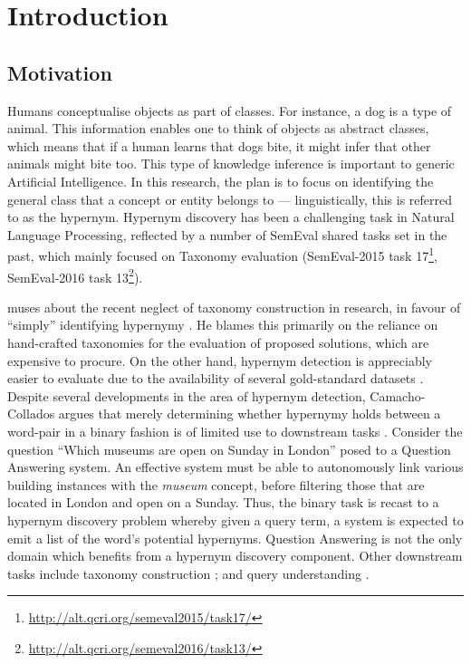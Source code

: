 \chapter{Introduction}

\section{Motivation}
Humans conceptualise objects as part of classes.  For instance, a dog is a type of animal. This information
enables one to think of objects as abstract classes, which means that if a human learns that dogs bite, it might infer that other animals might bite too.  This type of knowledge inference is important to generic Artificial Intelligence. In this research, the plan is to focus on identifying the general class that a concept or entity belongs to — linguistically, this is referred
to as the hypernym.  Hypernym discovery has been a challenging task in Natural Language Processing, reflected by a number of SemEval shared tasks set in the past, which mainly focused on Taxonomy evaluation (SemEval-2015 task 17\footnote{\url{http://alt.qcri.org/semeval2015/task17/}}, SemEval-2016 task 13\footnote{\url{http://alt.qcri.org/semeval2016/task13/}}).  

\citeauthor{camacho2017we} muses about the recent neglect of taxonomy construction in research, in favour of ``simply'' identifying hypernymy \citep{camacho2017we}.  He blames this primarily on the reliance on hand-crafted taxonomies for the evaluation of proposed solutions, which are expensive to procure.  On the other hand, hypernym detection is appreciably easier to evaluate due to the availability of several gold-standard datasets \citep{Baroni2011, santus2015evalution, weeds2014learning}.  Despite several developments in the area of hypernym detection, Camacho-Collados argues that merely determining whether hypernymy holds between a word-pair in a binary fashion is of limited use to downstream tasks \citep{camacho2017we}.  Consider the question “Which museums are open on Sunday in London” posed to a Question Answering system.  An effective system must be able to autonomously link various building instances with the \textit{museum} concept, before filtering those that are located in London and open on a Sunday.  Thus, the binary task is recast to a hypernym discovery problem whereby given a query term, a system is expected to emit a list of the word’s potential hypernyms.  Question Answering is not the only domain which benefits from a hypernym discovery component.  Other downstream tasks include taxonomy construction \citep{wu2012probase}; and query understanding \citep{hua2017understand}.

